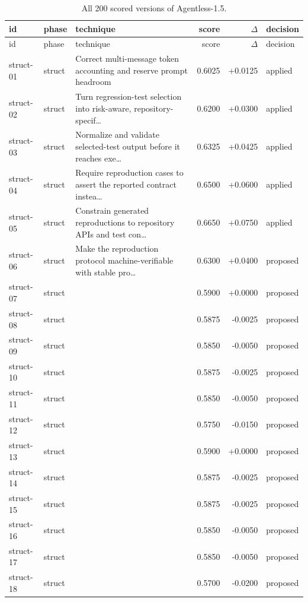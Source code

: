 \begin{center}\scriptsize\begin{longtable}{llp{5.2cm}rrl}
\caption{All 200 scored versions of Agentless-1.5.}\\
\toprule id & phase & technique & score & $\Delta$ & decision \\ \midrule \endfirsthead
\toprule id & phase & technique & score & $\Delta$ & decision \\ \midrule \endhead
struct-01 & struct & Correct multi-message token accounting and reserve prompt headroom & 0.6025 & +0.0125 & applied \\
struct-02 & struct & Turn regression-test selection into risk-aware, repository-specif\ldots{} & 0.6200 & +0.0300 & applied \\
struct-03 & struct & Normalize and validate selected-test output before it reaches exe\ldots{} & 0.6325 & +0.0425 & applied \\
struct-04 & struct & Require reproduction cases to assert the reported contract instea\ldots{} & 0.6500 & +0.0600 & applied \\
struct-05 & struct & Constrain generated reproductions to repository APIs and test con\ldots{} & 0.6650 & +0.0750 & applied \\
struct-06 & struct & Make the reproduction protocol machine-verifiable with stable pro\ldots{} & 0.6300 & +0.0400 & proposed \\
struct-07 & struct &  & 0.5900 & +0.0000 & proposed \\
struct-08 & struct &  & 0.5875 & -0.0025 & proposed \\
struct-09 & struct &  & 0.5850 & -0.0050 & proposed \\
struct-10 & struct &  & 0.5875 & -0.0025 & proposed \\
struct-11 & struct &  & 0.5850 & -0.0050 & proposed \\
struct-12 & struct &  & 0.5750 & -0.0150 & proposed \\
struct-13 & struct &  & 0.5900 & +0.0000 & proposed \\
struct-14 & struct &  & 0.5875 & -0.0025 & proposed \\
struct-15 & struct &  & 0.5875 & -0.0025 & proposed \\
struct-16 & struct &  & 0.5850 & -0.0050 & proposed \\
struct-17 & struct &  & 0.5850 & -0.0050 & proposed \\
struct-18 & struct &  & 0.5700 & -0.0200 & proposed \\

\end{longtable}
\end{center}

